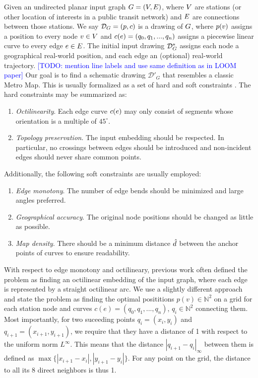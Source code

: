 \documentclass{sig-alternate-sigmod09}
\newcommand\TODO[1]{\textcolor{blue}{\small [TODO: #1]}}
\begin{document}
Given an undirected planar input graph $G = (V, E)$, where $V$ are stations (or other location of interests in a public transit network) and $E$ are connections between those stations.
We say $\mathcal{D}_{G} = (p, c)$ is a drawing of $G$, where $p(v)$ assigns a position to every node $v \in V$ and $c(e) = (q_0, q_1, ..., q_n)$ assigns a piecewise linear curve to every edge $e \in E$.
The initial input drawing $\mathcal{D}_{G}^*$ assigns each node a geographical real-world position, and each edge an (optional) real-world trajectory.
\TODO{mention line labels and use same definition as in LOOM paper}
Our goal is to find a schematic drawing $\mathcal{D}'_G$ that resembles a classic Metro Map.
This is usually formalized as a set of hard and soft constraints \cite{nb, ...}.
The hard constraints may be summarized as:
\begin{enumerate}
\setlength\itemsep{.1em}
\item \emph{Octilinearity}. Each edge curve $c(e)$ may only consist of segments whose orientation is a multiple of $45^{\circ}$.
\item \emph{Topology preservation}. The input embedding should be respected. In particular, no crossings between edges should be introduced and non-incident edges should never share common points.
\end{enumerate}
Additionally, the following soft constraints are usually employed:
\begin{enumerate}
\setlength\itemsep{.1em}
\item \emph{Edge monotony}. The number of edge bends should be minimized and large angles preferred.
\item \emph{Geographical accuracy}. The original node positions should be changed as little as possible.
\item \emph{Map density}. There should be a minimum distance $\hat d$ between the anchor points of curves to ensure readability.
\end{enumerate}

With respect to edge monotony and octilineary, previous work often defined the problem as finding an octilinear embedding of the input graph, where each edge is represented by a straight octilinear arc.
We use a slightly different approach and state the problem as finding the optimal posititions $p(v) \in \mathbb{N}^2$ on a grid for each station node and curves $c(e) = (q_0, q_1, ..., q_n)$, $q_i \in \mathbb{N}^2$ connecting them. 
Most importantly, for two suceeding points $q_i = (x_i, y_i)$ and $q_{i+1} = (x_{i+1}, y_{i+1})$, we require that they have a distance of 1 with respect to the uniform norm $L^{\infty}$.
This means that the distance $|q_{i+1} - q_{i}|_{\infty}$ between them is defined as $\max \{|x_{i+1} - x_i|, |y_{i+1} - y_i|\}$.
For any point on the grid, the distance to all its 8 direct neighbors is thus 1.
\end{document}

